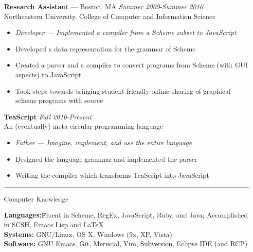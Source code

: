 \documentclass[10pt]{letter}
\begin{document}
\begin{tabbing}
{\large \bf Research Assistant} --- Boston, MA \` \textit{Summer 2009-Summer 2010} \\
Northeastern University, College of Computer and Information Science
\end{tabbing}\vspace{-10pt}
\begin{itemize}
\setlength\itemsep{1pt}
\item [] \textit{Developer --- Implemented a compiler from a Scheme subset to JavaScript}
\item Developed a data representation for the grammar of Scheme
\item Created a parser and a compiler to convert programs from Scheme (with GUI aspects) to JavaScript
\item Took steps towards bringing student friendly online sharing of graphical scheme programs with source
\end{itemize}

\begin{tabbing}
{\large \bf TeaScript} \` \textit{Fall 2010-Present} \\
An (eventually) meta-circular programming language

\end{tabbing}\vspace{-10pt}

\begin{itemize}
\setlength\itemsep{1pt}
\item [] \textit{Father --- Imagine, implement, and use the entire language }
\item Designed the language grammar and implemented the parser
\item Writing the compiler which transforms TeaScript into JavaScript
\end{itemize}

\rule{\linewidth}{.5pt}


{\Large Computer Knowledge}
\begin{tabbing}
\textbf{Languages:}\hspace{.2in}\= Fluent in Scheme, RegEx, JavaScript, Ruby,
                   and Java; Accomplished in SCSH, Emacs Lisp and \LaTeX\\
\textbf{Systems:}\> GNU/Linux, OS X, Windows (9x, XP, Vista)\\
\textbf{Software:}\> GNU Emacs, Git, Merucial, Vim, Subversion,
                     Eclipse IDE (and RCP)
\end{tabbing}\vspace{-15pt}
\end{document}
